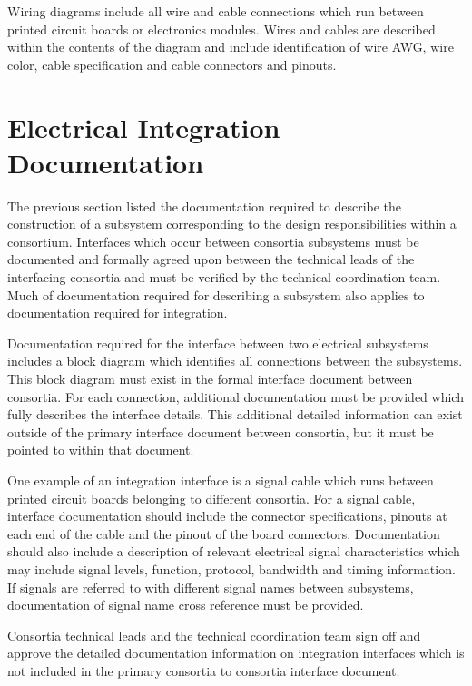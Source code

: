 Wiring diagrams include all wire and cable connections which
run between printed circuit boards or electronics modules.  Wires and
cables are described within the contents of the diagram and
include identification of wire AWG, wire color, cable specification
and cable connectors and pinouts.




\section{Electrical Integration Documentation}
\label{sec:fdsp-coord-integ-electrical}
The previous section listed the documentation required to describe the
construction of a subsystem corresponding to the design
responsibilities within a consortium.  Interfaces which occur between
consortia subsystems must be documented and formally agreed upon
between the technical leads of the interfacing consortia and must be
verified by the technical coordination team.  Much of
documentation required for describing a subsystem also applies to
documentation required for integration.


Documentation required for the interface between two electrical
subsystems includes a block diagram which identifies all connections
between the subsystems.  This block diagram must exist in the formal
interface document between consortia.  For each connection, additional
documentation must be provided which fully describes the interface
details. This additional detailed information can exist outside of the
primary interface document between consortia, but it must be pointed
to within that document.


One example of an integration interface is a signal cable which runs
between printed circuit boards belonging to different consortia.  For
a signal cable, interface documentation should include the connector
specifications, pinouts at each end of the cable and the pinout of the
board connectors.  Documentation should also include a description of
relevant electrical signal characteristics which may include signal
levels, function, protocol, bandwidth and timing information.  If
signals are referred to with different signal names between
subsystems, documentation of signal name cross reference must be
provided.


Consortia technical leads and the technical coordination team sign off
and approve the detailed documentation information on integration
interfaces which is not included in the primary consortia to consortia
interface document.





